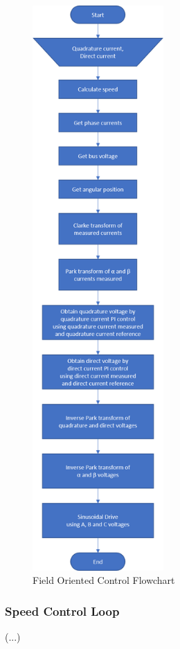 \vfill
\begin{figure}[htbp]
\centering
\includegraphics[width=5cm]{Images/flowcharts/foc_flow.png} 
\caption[Field Oriented Control Flowchart]{Field Oriented Control Flowchart}
\label{fig:foc_flow}
\end{figure}
\vfill
\clearpage

\subsubsection{Speed Control Loop}

(...)\\


